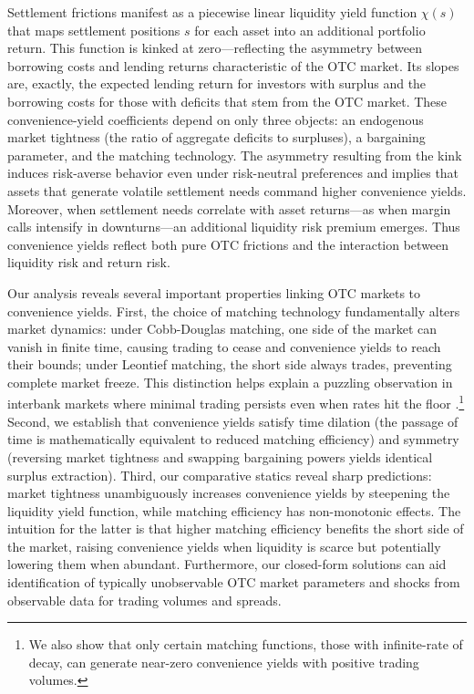 Settlement frictions manifest
as a piecewise linear liquidity yield function $\chi\left(s\right)$
that maps settlement positions $s$ for each asset into an additional portfolio return.
This function is kinked at zero---reflecting the asymmetry
between borrowing costs and lending returns characteristic of the OTC market.
Its slopes are, exactly, the expected lending return for investors
with surplus and the borrowing costs for those with deficits that
stem from the OTC market. These convenience-yield coefficients depend
on only three objects: an endogenous market tightness (the ratio of
aggregate deficits to surpluses), a bargaining parameter, and the
matching technology. The asymmetry resulting from the kink induces risk-averse behavior even under risk-neutral preferences and implies that assets that generate volatile settlement needs command higher
convenience yields. Moreover, when settlement
needs correlate with asset returns---as when margin calls intensify
in downturns---an additional liquidity risk premium emerges. Thus
convenience yields reflect both pure OTC frictions and the interaction
between liquidity risk and return risk. 

Our analysis reveals several important properties linking OTC markets
to convenience yields. First, the choice of matching technology fundamentally
alters market dynamics: under Cobb-Douglas matching, one side of the
market can vanish in finite time, causing trading to cease and convenience
yields to reach their bounds; under Leontief matching, the short side
always trades, preventing complete market freeze. This distinction
helps explain a puzzling observation in interbank markets where minimal
trading persists even when rates hit the floor \citep[e.g., see][]{LopesSalidosVissingJorgenson,AfonsoGiannoneLaSpadaWilliams,LagosNavarro2023}.\footnote{We also show that only certain matching functions, those with
infinite-rate of decay, can generate near-zero convenience yields
with positive trading volumes.} Second, we establish that convenience yields satisfy time dilation (the passage of time is mathematically equivalent
to reduced matching efficiency) and symmetry (reversing market tightness
and swapping bargaining powers yields identical surplus extraction).
Third, our comparative statics reveal sharp predictions: market tightness
unambiguously increases convenience yields by steepening the liquidity
yield function, while matching efficiency has non-monotonic effects. The intuition for the latter is that higher matching efficiency benefits the short side of the market, raising convenience yields
when liquidity is scarce but potentially lowering them when abundant. 
Furthermore, our closed-form solutions can  aid identification of typically unobservable OTC market
parameters and shocks from observable data for trading volumes and spreads. 

